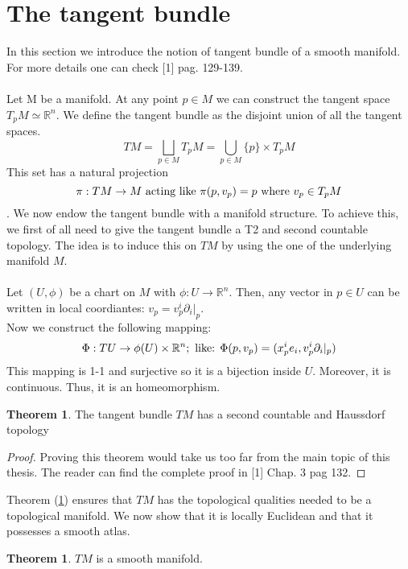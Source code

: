 \documentclass[12pt,a4paper]{report}
\theoremstyle{definition}
\theoremstyle{Theorem}
\newtheorem{Theo}[Def]{Theorem}
\theoremstyle{definition}
\theoremstyle{definition}
\begin{document}
		\section{The tangent bundle}
		In this section we introduce the notion of tangent bundle of a smooth manifold. For more details one can check [1] pag. 129-139.\\
		\\
		Let M be a manifold. At any point $p\in M$ we can construct the tangent space $T_pM\simeq \mathbb{R}^n$. We define the tangent bundle as the disjoint union of all the tangent spaces.
		$$TM=\bigsqcup_{p\in M}T_pM=\bigcup_{p\in M} \{p\}\times T_pM$$
		This set has a natural projection 
		$$\pi:TM\rightarrow M\hbox{ acting like }\pi(p,v_p)=p \hbox{ where }v_p\in T_pM$$.  
		We now endow the tangent bundle with a manifold structure. To achieve this, we first of all need to give the tangent bundle a T2 and second countable topology. The idea is to induce this on $TM$ by using the one of the underlying manifold $M$.\\
		\\
		Let $(U,\phi)$ be a chart on $M$ with $\phi:U\rightarrow \mathbb{R}^n$. Then, any vector in $p\in U$ can be written in local coordiantes: $v_p=v^i_p\partial_i|_p$.\\
		Now we construct the following mapping:
		$$\Phi:TU\rightarrow \phi(U)\times \mathbb{R}^n; \hbox{ like: }
		\Phi(p,v_p)=(x^i_pe_i,v^i_p\partial_i|_p)$$
		This mapping is 1-1 and surjective so it is a bijection inside $U$. Moreover, it is continuous. Thus, it is an homeomorphism.
		\begin{Theo} \label{Theo_1.1}
			The tangent bundle $TM$ has a second countable and Haussdorf topology
		\end{Theo}
		\begin{proof}
			Proving this theorem would take us too far from the main topic of this thesis. The reader can find the complete proof in [1] Chap. 3 pag 132.
		\end{proof}
		Theorem (\ref{Theo_1.1}) ensures that $TM$ has the topological qualities needed to be a topological manifold. We now show that it is locally Euclidean and that it possesses a smooth atlas.
		\begin{Theo}
			$TM$ is a smooth manifold.
		\end{Theo}
\end{document}
